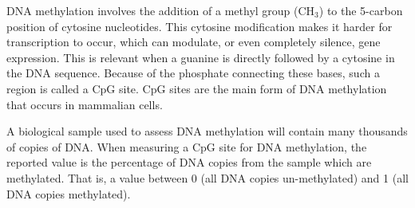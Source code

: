 \documentclass{article}
\begin{document}
DNA methylation involves the addition of a methyl group (CH\(_3\)) to the 5-carbon position of cytosine nucleotides. This cytosine modification makes it harder for transcription to occur, which can modulate, or even completely silence, gene expression. This is relevant when a guanine is directly followed by a cytosine in the DNA sequence. Because of the phosphate connecting these bases, such a region is called a CpG site. CpG sites are the main form of DNA methylation that occurs in mammalian cells.

A biological sample used to assess DNA methylation will contain many thousands of copies of DNA. When measuring a CpG site for DNA methylation, the reported value is the percentage of DNA copies from the sample which are methylated. That is, a value between 0 (all DNA copies un-methylated) and 1 (all DNA copies methylated).

\end{document}
